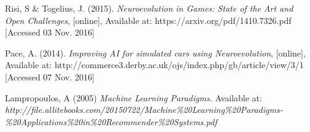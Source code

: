 \documentclass[11pt,a4paper]{article}
\begin{document}
\begin{thebibliography}{10}

	Risi, S \& Togelius, J.
	(2015).
	\emph{Neuroevolution in Games: State of the Art and Open Challenges},
  	[online],
  	Available at: https://arxiv.org/pdf/1410.7326.pdf
  	[Accessed 03 Nov. 2016]

	Pace, A. 
	(2014).
	\emph{Improving AI for simulated cars using Neuroevolution},
	[online],
	Available at: http://commerce3.derby.ac.uk/ojs/index.php/gb/article/view/3/1
	[Accessed 07 Nov. 2016]
	
	Lampropoulos, A
	(2005)
	\emph{Machine Learning Paradigms.}
	Available at: \textit{http://file.allitebooks.com/20150722/Machine\%20Learning\%20Paradigms-\%20Applications\%20in\%20Recommender\%20Systems.pdf}
  

\end{thebibliography}
\end{document}
